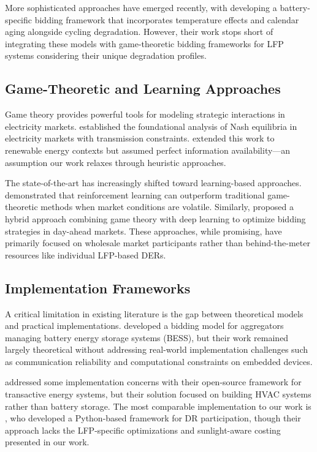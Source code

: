 \documentclass[11pt,a4paper]{article}
\begin{document}
More sophisticated approaches have emerged recently, with \citet{Hashmi2019} developing a battery-specific bidding framework that incorporates temperature effects and calendar aging alongside cycling degradation. However, their work stops short of integrating these models with game-theoretic bidding frameworks for LFP systems considering their unique degradation profiles.

\subsection{Game-Theoretic and Learning Approaches}
Game theory provides powerful tools for modeling strategic interactions in electricity markets. \citet{Baldick2004} established the foundational analysis of Nash equilibria in electricity markets with transmission constraints. \citet{Nekouei2015} extended this work to renewable energy contexts but assumed perfect information availability—an assumption our work relaxes through heuristic approaches.

The state-of-the-art has increasingly shifted toward learning-based approaches. \citet{Zhang2019} demonstrated that reinforcement learning can outperform traditional game-theoretic methods when market conditions are volatile. Similarly, \citet{Wang2020} proposed a hybrid approach combining game theory with deep learning to optimize bidding strategies in day-ahead markets. These approaches, while promising, have primarily focused on wholesale market participants rather than behind-the-meter resources like individual LFP-based DERs.

\subsection{Implementation Frameworks}
A critical limitation in existing literature is the gap between theoretical models and practical implementations. \citet{Iria2019} developed a bidding model for aggregators managing battery energy storage systems (BESS), but their work remained largely theoretical without addressing real-world implementation challenges such as communication reliability and computational constraints on embedded devices.

\citet{Chassin2018} addressed some implementation concerns with their open-source framework for transactive energy systems, but their solution focused on building HVAC systems rather than battery storage. The most comparable implementation to our work is \citet{Lakshmanan2021}, who developed a Python-based framework for DR participation, though their approach lacks the LFP-specific optimizations and sunlight-aware costing presented in our work.
\end{document}
